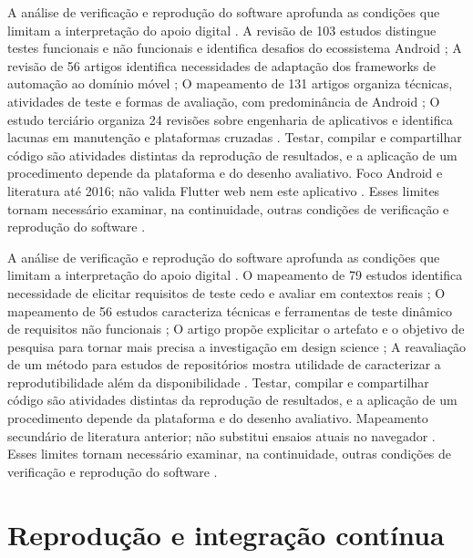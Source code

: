 A análise de verificação e reprodução do software aprofunda as condições que limitam a interpretação do apoio digital \citep{eng01} \citep{eng02} \citep{eng03} \citep{eng04}. A revisão de 103 estudos distingue testes funcionais e não funcionais e identifica desafios do ecossistema Android \citep{eng01}; A revisão de 56 artigos identifica necessidades de adaptação dos frameworks de automação ao domínio móvel \citep{eng02}; O mapeamento de 131 artigos organiza técnicas, atividades de teste e formas de avaliação, com predominância de Android \citep{eng03}; O estudo terciário organiza 24 revisões sobre engenharia de aplicativos e identifica lacunas em manutenção e plataformas cruzadas \citep{eng04}. Testar, compilar e compartilhar código são atividades distintas da reprodução de resultados, e a aplicação de um procedimento depende da plataforma e do desenho avaliativo. Foco Android e literatura até 2016; não valida Flutter web nem este aplicativo \citep{eng01} \citep{eng02} \citep{eng03} \citep{eng04}. Esses limites tornam necessário examinar, na continuidade, outras condições de verificação e reprodução do software \citep{eng01} \citep{eng02} \citep{eng03} \citep{eng04}.

A análise de verificação e reprodução do software aprofunda as condições que limitam a interpretação do apoio digital \citep{eng05} \citep{eng06} \citep{eng07} \citep{eng08}. O mapeamento de 79 estudos identifica necessidade de elicitar requisitos de teste cedo e avaliar em contextos reais \citep{eng05}; O mapeamento de 56 estudos caracteriza técnicas e ferramentas de teste dinâmico de requisitos não funcionais \citep{eng06}; O artigo propõe explicitar o artefato e o objetivo de pesquisa para tornar mais precisa a investigação em design science \citep{eng07}; A reavaliação de um método para estudos de repositórios mostra utilidade de caracterizar a reprodutibilidade além da disponibilidade \citep{eng08}. Testar, compilar e compartilhar código são atividades distintas da reprodução de resultados, e a aplicação de um procedimento depende da plataforma e do desenho avaliativo. Mapeamento secundário de literatura anterior; não substitui ensaios atuais no navegador \citep{eng05} \citep{eng06} \citep{eng07} \citep{eng08}. Esses limites tornam necessário examinar, na continuidade, outras condições de verificação e reprodução do software \citep{eng05} \citep{eng06} \citep{eng07} \citep{eng08}.

\clearpage\section{Reprodução e integração contínua}


